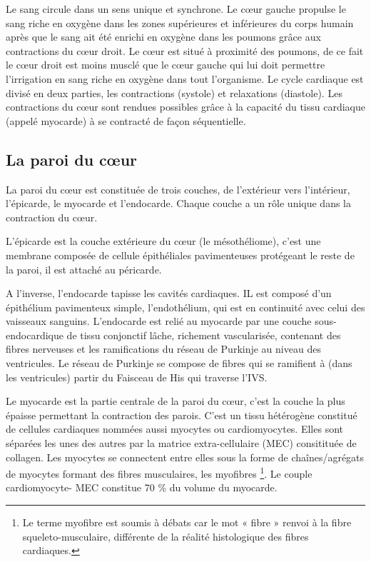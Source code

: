 Le sang circule dans un sens unique et synchrone. Le cœur gauche propulse le sang riche en oxygène dans 
les zones supérieures et inférieures du corps humain après que le sang ait été enrichi en oxygène dans les poumons grâce 
aux contractions du cœur droit. Le cœur est situé à proximité des poumons, de ce fait le cœur droit est moins musclé que
 le cœur gauche qui lui doit permettre l’irrigation en sang riche en oxygène dans tout l’organisme. 
 Le cycle cardiaque est divisé en deux parties, les contractions (systole) et relaxations (diastole). 
 Les contractions du cœur sont rendues possibles grâce à la capacité du tissu cardiaque  (appelé myocarde) 
 à se contracté de façon séquentielle. 

\subsection{La paroi du cœur}
La paroi du cœur est constituée de trois couches, de l’extérieur vers l’intérieur, l’épicarde, le myocarde et l’endocarde. 
Chaque couche a un rôle unique dans la contraction du cœur.

\begin{bulletList}
\item L’épicarde est la couche extérieure du cœur (le mésothéliome), c’est une membrane composée de cellule épithéliales 
pavimenteuses protégeant le reste de la paroi, il est attaché au péricarde.

\item A l’inverse, l’endocarde tapisse les cavités cardiaques. IL est composé d'un épithélium pavimenteux simple, 
l'endothélium, qui est en continuité avec celui des vaisseaux sanguins. L'endocarde est relié au myocarde par 
une couche sous-endocardique de tissu conjonctif lâche, richement vascularisée, contenant des fibres nerveuses 
et les ramifications du réseau de Purkinje au niveau des ventricules. Le réseau de Purkinje se compose de fibres qui se ramifient à 
(dans les ventricules) partir du  Faisceau de His qui traverse l'IVS.

\item Le myocarde est la partie centrale de la paroi du cœur, c’est la couche la plus épaisse permettant la contraction des parois. C’est un tissu hétérogène constitué de cellules cardiaques nommées aussi myocytes ou cardiomyocytes. Elles sont séparées les unes des autres par la matrice extra-cellulaire (MEC) consitituée de collagen. Les myocytes se connectent entre elles sous la forme de chaînes/agrégats de myocytes formant des fibres musculaires, les myofibres \footnote{Le terme myofibre est soumis à débats car le mot « fibre » renvoi à la fibre squeleto-musculaire, différente de la réalité histologique des fibres cardiaques. }. Le couple cardiomyocyte- MEC constitue 70  \% du volume du myocarde. \\
\end{bulletList}

